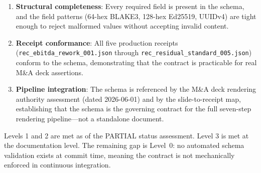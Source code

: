 \begin{enumerate}
  \item \textbf{Structural completeness}: Every required field is present in the schema, and the
    field patterns (64-hex BLAKE3, 128-hex Ed25519, UUIDv4) are tight enough to reject malformed
    values without accepting invalid content.
  \item \textbf{Receipt conformance}: All five production receipts (\texttt{rec\_ebitda\_rework\_001.json}
    through \texttt{rec\_residual\_standard\_005.json}) conform to the schema, demonstrating that
    the contract is practicable for real M\&A deck assertions.
  \item \textbf{Pipeline integration}: The schema is referenced by the M\&A deck rendering authority
    assessment (dated 2026-06-01) and by the slide-to-receipt map, establishing that the schema is
    the governing contract for the full seven-step rendering pipeline---not a standalone document.
\end{enumerate}

Levels 1 and 2 are met as of the PARTIAL status assessment. Level 3 is met at the documentation
level. The remaining gap is Level~0: no automated schema validation exists at commit time, meaning
the contract is not mechanically enforced in continuous integration.
